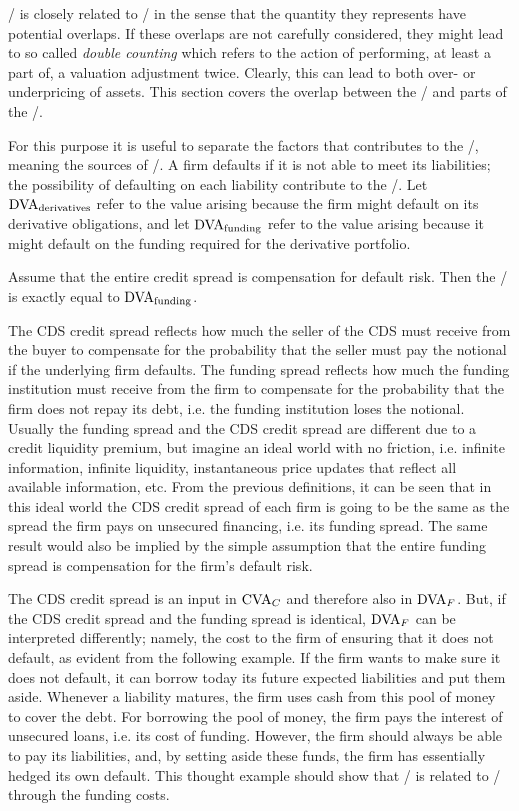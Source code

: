 \documentclass[main.tex]{subfiles}
\begin{document}
    \FVA/ is closely related to \DVA/ in the sense that the quantity they represents have potential overlaps.
    If these overlaps are not carefully considered, they might lead to so called \textit{double counting}
    which refers to the action of performing, at least a part of, a valuation adjustment twice. 
    Clearly, this can lead to both over- or underpricing of assets.
    This section covers the overlap between the \FVA/ and parts of the \DVA/.

    For this purpose it is useful to separate the factors that contributes to the \DVA/,
    meaning the sources of \DVA/. 
    A firm defaults if it is not able to meet its liabilities;
    the possibility of defaulting on each liability contribute to the \DVA/.
    Let $\DVA/_{\text{derivatives}}$ refer to the value arising
    because the firm might default on its derivative obligations,
    and let $\DVA/_{\text{funding}}$ refer to the value arising 
    because it might default on the funding required for the derivative portfolio.

    Assume that the entire credit spread is compensation for default risk.
    Then the \FBA/ is exactly equal to $\DVA/_{\text{funding}}$. 

    The CDS credit spread reflects how much the seller of the CDS must receive from the buyer
    to compensate for the probability that the seller must pay the notional if the underlying firm defaults.
    The funding spread reflects how much the funding institution must receive from the firm 
    to compensate for the probability that the firm does not repay its debt, 
    i.e. the funding institution loses the notional.
    Usually the funding spread and the CDS credit spread are different due to a credit liquidity premium,
    but imagine an ideal world with no friction, i.e. infinite information, infinite liquidity, 
    instantaneous price updates that reflect all available information, etc.
    From the previous definitions, it can be seen that in this ideal world
    the CDS credit spread of each firm is going to be the same 
    as the spread the firm pays on unsecured financing, i.e. its funding spread.
    The same result would also be implied by the simple assumption 
    that the entire funding spread is compensation for the firm's default risk.

    The CDS credit spread is an input in $\CVA/_{C}$ and therefore also in $\DVA/_{F}$.
    But, if the CDS credit spread and the funding spread is identical, $\DVA/_{F}$ can be interpreted differently;
    namely, the cost to the firm of ensuring that it does not default, as evident from the following example.
    If the firm wants to make sure it does not default,
    it can borrow today its future expected liabilities and put them aside.
    Whenever a liability matures, the firm uses cash from this pool of money to cover the debt.
    For borrowing the pool of money, the firm pays the interest of unsecured loans, i.e. its cost of funding.
    However, the firm should always be able to pay its liabilities,
    and, by setting aside these funds, the firm has essentially hedged its own default. 
    This thought example should show that \DVA/ is related to \FVA/ through the funding costs.
    
\end{document}
